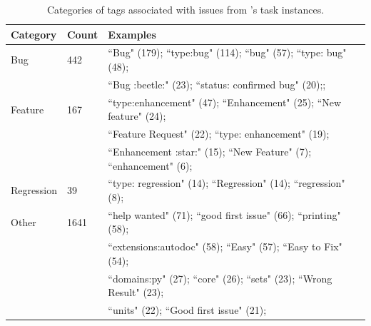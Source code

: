 \begin{table}[ht]
\centering
\begin{tabular}{l|ll}
\toprule
    Category & Count & Examples \\
\midrule
    Bug & 442 & ``Bug" (179); ``type:bug" (114); ``bug" (57); ``type: bug" (48); \\
        & & ``Bug :beetle:" (23); ``status: confirmed bug" (20);; \\
    Feature & 167 & ``type:enhancement" (47); ``Enhancement" (25); ``New feature" (24); \\
        & & ``Feature Request" (22); ``type: enhancement" (19); \\
        & & ``Enhancement :star:" (15); ``New Feature" (7); ``enhancement" (6);  \\
    Regression & 39 & ``type: regression" (14); ``Regression" (14); ``regression" (8); \\
    Other & 1641 & ``help wanted" (71); ``good first issue" (66); ``printing" (58); \\
        & & ``extensions:autodoc" (58); ``Easy" (57); ``Easy to Fix" (54); \\
        & & ``domains:py" (27); ``core" (26); ``sets" (23); ``Wrong Result" (23); \\
        & & ``units" (22); ``Good first issue" (21); \\
\bottomrule
\end{tabular}
\caption{Categories of tags associated with issues from \benchmark{}'s task instances.}
\label{table:issue-tags}
\end{table}